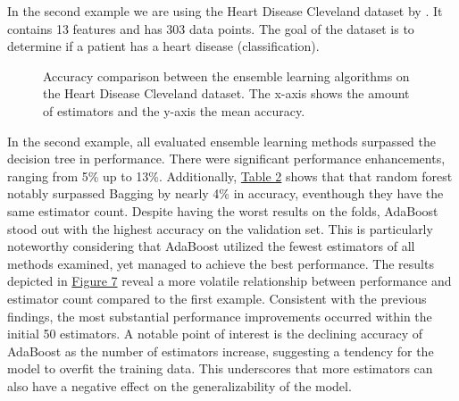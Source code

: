 In the second example we are using the Heart Disease Cleveland dataset by
\citet*{heart_disease_cleveland}. It contains 13 features and has 303 data 
points. The goal of the dataset is to determine if a patient has a heart
disease (classification).



\begin{figure}[htbp]
    \centering
    \label{fig:hdc_comparison}
    \caption{
        Accuracy comparison between the ensemble learning algorithms on the Heart Disease Cleveland dataset.
        The x-axis shows the amount of estimators and the y-axis the mean accuracy.
    }
\end{figure}

In the second example, all evaluated ensemble learning methods surpassed the decision tree in performance.
There were significant performance enhancements, ranging from 5\% up to 13\%.
Additionally, \hyperref[tab:hdc_table]{Table 2} shows that that random forest notably surpassed Bagging by
nearly 4\% in accuracy, eventhough they have the same estimator count.
Despite having the worst results on the folds, AdaBoost stood out with the highest accuracy on the validation set.
This is particularly noteworthy considering that AdaBoost utilized the fewest estimators of all methods examined,
yet managed to achieve the best performance.
The results depicted in \hyperref[fig:hdc_comparison]{Figure 7} reveal a more volatile relationship between
performance and estimator count compared to the first example. Consistent with the previous findings, the most
substantial performance improvements occurred within the initial 50 estimators.
A notable point of interest is the declining accuracy of AdaBoost as the number of estimators increase, suggesting
a tendency for the model to overfit the training data.
This underscores that more estimators can also have a negative effect on the generalizability of the model. 

\newpage %
